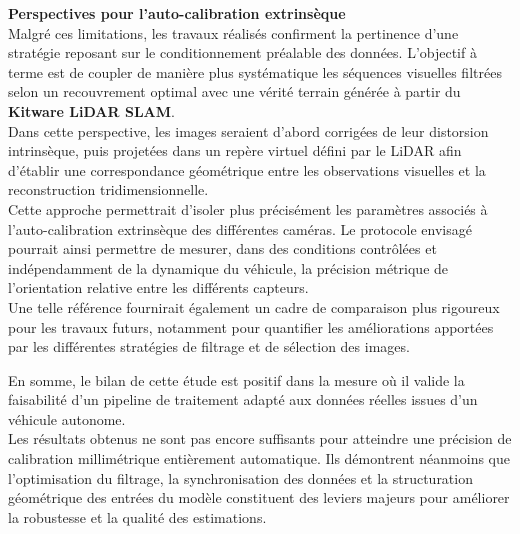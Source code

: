 \documentclass[12pt,a4paper,oneside]{report}
\begin{document}
\par\bigskip
\par\bigskip

\hspace*{0.4cm}\textbf{Perspectives pour l'auto-calibration extrinsèque}\\

\hspace*{.3cm}Malgré ces limitations, les travaux réalisés confirment la pertinence d'une stratégie reposant sur le conditionnement préalable des données. L'objectif à terme est de coupler de manière plus systématique les séquences visuelles filtrées selon un recouvrement optimal avec une vérité terrain générée à partir du \textbf{Kitware LiDAR SLAM}.\\
\hspace*{.3cm}Dans cette perspective, les images seraient d'abord corrigées de leur distorsion intrinsèque, puis projetées dans un repère virtuel défini par le LiDAR afin d'établir une correspondance géométrique entre les observations visuelles et la reconstruction tridimensionnelle.\\

\hspace*{.3cm}Cette approche permettrait d'isoler plus précisément les paramètres associés à l'auto-calibration extrinsèque des différentes caméras. Le protocole envisagé pourrait ainsi permettre de mesurer, dans des conditions contrôlées et indépendamment de la dynamique du véhicule, la précision métrique de l'orientation relative entre les différents capteurs.\\
Une telle référence fournirait également un cadre de comparaison plus rigoureux pour les travaux futurs, notamment pour quantifier les améliorations apportées par les différentes stratégies de filtrage et de sélection des images.

\par\bigskip

\hspace*{.3cm}En somme, le bilan de cette étude est positif dans la mesure où il valide la faisabilité d'un pipeline de traitement adapté aux données réelles issues d'un véhicule autonome.\\
\hspace*{.3cm}Les résultats obtenus ne sont pas encore suffisants pour atteindre une précision de calibration millimétrique entièrement automatique. Ils démontrent néanmoins que l'optimisation du filtrage, la synchronisation des données et la structuration géométrique des entrées du modèle constituent des leviers majeurs pour améliorer la robustesse et la qualité des estimations.\\
\end{document}
